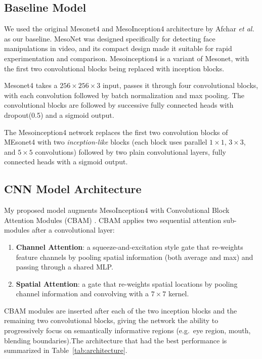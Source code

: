 \documentclass[conference]{IEEEtran}
\begin{document}
\subsection{Baseline Model}
\label{sec:baseline}

We used the original Mesonet4 and MesoInception4 architecture by Afchar
\emph{et al.}~\cite{afchar2018mesonet} as our baseline.  MesoNet was
designed specifically for detecting face manipulations in video, and
its compact design made it suitable for rapid
experimentation and comparison. Mesoinception4 is a variant of Mesonet, with the first two convolutional blocks being replaced with inception blocks.

Mesonet4 takes a $256 \times 256 \times 3$ input, passes it through four convolutional blocks, with each convolution followed by batch normalization and max pooling. The convolutional blocks are followed by successive fully connected heads with dropout(0.5) and a sigmoid output.

The Mesoinception4 network 
replaces the first two convolution blocks of MEsonet4 with two \emph{inception-like} blocks (each block uses parallel
$1\times1$, $3\times3$, and $5\times5$ convolutions) followed by two
plain convolutional layers, fully
connected heads with a sigmoid output.

\subsection{CNN Model Architecture}
\label{sec:architecture}

My proposed model augments MesoInception4 with Convolutional Block
Attention Modules (CBAM) \cite{woo2018cbam}.  CBAM applies two
sequential attention sub-modules after a convolutional layer:

\begin{enumerate}
  \item \textbf{Channel Attention}: a squeeze-and-excitation style
        gate that re-weights feature channels by pooling spatial
        information (both average and max) and passing through a shared
        MLP.
  \item \textbf{Spatial Attention}: a gate that re-weights spatial
        locations by pooling channel information and convolving with a
        $7 \times 7$ kernel.
\end{enumerate}

CBAM modules are inserted after each of the two inception blocks and
the remaining two convolutional blocks, giving the network the ability to
progressively focus on semantically informative regions (e.g.\ eye region, mouth,
blending boundaries).The architecture that had the best performance is summarized in Table~\ref{tab:architecture}.
\end{document}
